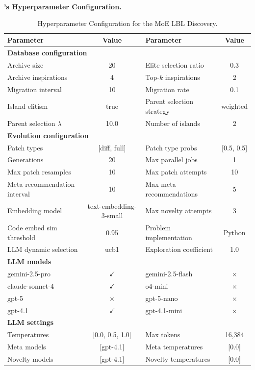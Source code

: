 \clearpage
\textbf{\ouralgo's Hyperparameter Configuration.}
\begin{table}[h]
\centering
\small
\begin{tabular}{lclc}
\toprule
\textbf{Parameter} & \textbf{Value} & \textbf{Parameter} & \textbf{Value} \\
\midrule
\multicolumn{4}{l}{\textbf{Database configuration}} \\
\midrule
Archive size & 20 & Elite selection ratio & 0.3 \\
Archive inspirations & 4 & Top-$k$ inspirations & 2 \\
Migration interval & 10 & Migration rate & 0.1 \\
Island elitism & true & Parent selection strategy & weighted \\
Parent selection $\lambda$ & 10.0 & Number of islands & 2 \\
\midrule
\multicolumn{4}{l}{\textbf{Evolution configuration}} \\
\midrule
Patch types & [diff, full] & Patch type probs & [0.5, 0.5] \\
Generations & 20 & Max parallel jobs & 1 \\
Max patch resamples & 10 & Max patch attempts & 10 \\
Meta recommendation interval & 10 & Max meta recommendations & 5 \\
Embedding model & text-embedding-3-small & Max novelty attempts & 3 \\
Code embed sim threshold & 0.95 & Problem implementation & Python \\
LLM dynamic selection & ucb1 & Exploration coefficient & 1.0 \\
\midrule
\multicolumn{4}{l}{\textbf{LLM models}} \\
\midrule
gemini-2.5-pro & $\checkmark$ & gemini-2.5-flash & $\times$ \\
claude-sonnet-4 & $\checkmark$ & o4-mini & $\times$ \\
gpt-5 & $\times$ & gpt-5-nano & $\times$ \\
gpt-4.1 & $\checkmark$ & gpt-4.1-mini & $\times$ \\
\midrule
\multicolumn{4}{l}{\textbf{LLM settings}} \\
\midrule
Temperatures & [0.0, 0.5, 1.0] & Max tokens & 16{,}384 \\
Meta models & [gpt-4.1] & Meta temperatures & [0.0] \\
Novelty models & [gpt-4.1] & Novelty temperatures & [0.0] \\
\bottomrule
\end{tabular}
  \caption{\ouralgo Hyperparameter Configuration for the MoE LBL Discovery.}
  \label{tab:hyperparams_moe}
\end{table}


